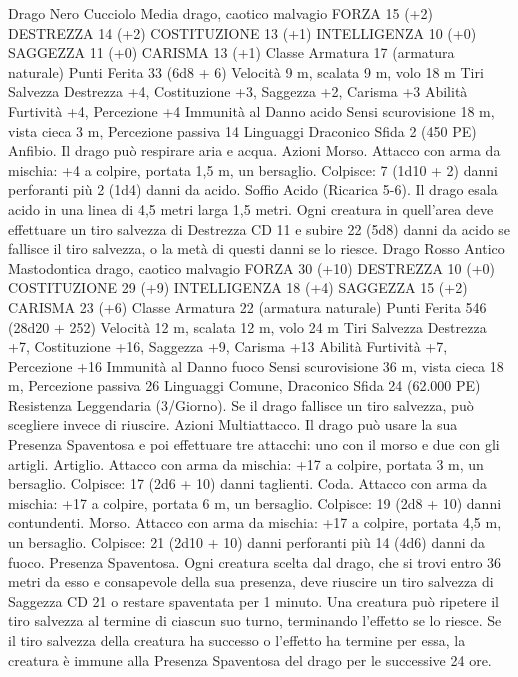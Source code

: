 \begin{multicols}{2}
Drago Nero Cucciolo
Media drago, caotico malvagio
FORZA 15 (+2)
DESTREZZA 14 (+2)
COSTITUZIONE 13 (+1)
INTELLIGENZA 10 (+0)
SAGGEZZA 11 (+0)
CARISMA 13 (+1)
Classe Armatura 17 (armatura naturale)
Punti Ferita 33 (6d8 + 6)
Velocità 9 m, scalata 9 m, volo 18 m
Tiri Salvezza Destrezza +4, Costituzione +3, Saggezza +2,
Carisma +3
Abilità Furtività +4, Percezione +4
Immunità al Danno acido
Sensi scurovisione 18 m, vista cieca 3 m, Percezione passiva 14
Linguaggi Draconico
Sfida 2 (450 PE)
Anfibio. Il drago può respirare aria e acqua.
Azioni
Morso. Attacco con arma da mischia: +4 a colpire, portata 1,5
m, un bersaglio.
Colpisce: 7 (1d10 + 2) danni perforanti più 2 (1d4) danni da acido.
Soffio Acido (Ricarica 5-6). Il drago esala acido in una linea di
4,5 metri larga 1,5 metri. Ogni creatura in quell’area deve
effettuare un tiro salvezza di Destrezza CD 11 e subire 22 (5d8)
danni da acido se fallisce il tiro salvezza, o la metà di questi
danni se lo riesce.
Drago Rosso Antico
Mastodontica drago, caotico malvagio
FORZA 30 (+10)
DESTREZZA 10 (+0)
COSTITUZIONE 29 (+9)
INTELLIGENZA 18 (+4)
SAGGEZZA 15 (+2)
CARISMA 23 (+6)
Classe Armatura 22 (armatura naturale)
Punti Ferita 546 (28d20 + 252)
Velocità 12 m, scalata 12 m, volo 24 m
Tiri Salvezza Destrezza +7, Costituzione +16, Saggezza +9,
Carisma +13
Abilità Furtività +7, Percezione +16
Immunità al Danno fuoco
Sensi scurovisione 36 m, vista cieca 18 m, Percezione passiva 26
Linguaggi Comune, Draconico
Sfida 24 (62.000 PE)
Resistenza Leggendaria (3/Giorno). Se il drago fallisce un tiro
salvezza, può scegliere invece di riuscire.
Azioni
Multiattacco. Il drago può usare la sua Presenza Spaventosa e
poi effettuare tre attacchi: uno con il morso e due con gli artigli.
Artiglio. Attacco con arma da mischia: +17 a colpire, portata 3
m, un bersaglio.
Colpisce: 17 (2d6 + 10) danni taglienti.
Coda. Attacco con arma da mischia: +17 a colpire, portata 6 m,
un bersaglio.
Colpisce: 19 (2d8 + 10) danni contundenti.
Morso. Attacco con arma da mischia: +17 a colpire, portata 4,5
m, un bersaglio.
Colpisce: 21 (2d10 + 10) danni perforanti più 14 (4d6) danni da
fuoco.
Presenza Spaventosa. Ogni creatura scelta dal drago, che si trovi
entro 36 metri da esso e consapevole della sua presenza, deve
riuscire un tiro salvezza di Saggezza CD 21 o restare spaventata
per 1 minuto. Una creatura può ripetere il tiro salvezza al termine
di ciascun suo turno, terminando l’effetto se lo riesce. Se il tiro
salvezza della creatura ha successo o l’effetto ha termine per
essa, la creatura è immune alla Presenza Spaventosa del drago
per le successive 24 ore.

\end{multicols}
